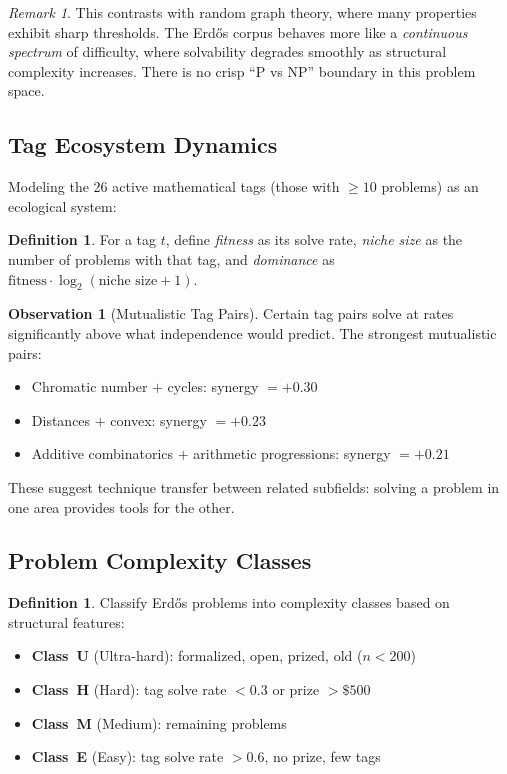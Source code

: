 \documentclass[11pt,a4paper]{article}
\theoremstyle{definition}
\newtheorem{definition}[theorem]{Definition}
\newtheorem{observation}[theorem]{Observation}
\theoremstyle{remark}
\newtheorem{remark}[theorem]{Remark}
\begin{document}
\begin{remark}
This contrasts with random graph theory, where many properties exhibit sharp
thresholds. The Erd\H{o}s corpus behaves more like a \emph{continuous spectrum}
of difficulty, where solvability degrades smoothly as structural complexity
increases. There is no crisp ``P vs NP'' boundary in this problem space.
\end{remark}

\subsection{Tag Ecosystem Dynamics}

Modeling the 26 active mathematical tags (those with $\geq 10$ problems) as
an ecological system:

\begin{definition}
For a tag $t$, define \emph{fitness} as its solve rate, \emph{niche size} as
the number of problems with that tag, and \emph{dominance} as
$\text{fitness} \cdot \log_2(\text{niche size} + 1)$.
\end{definition}

\begin{observation}[Mutualistic Tag Pairs]
Certain tag pairs solve at rates significantly above what independence would
predict. The strongest mutualistic pairs:
\begin{itemize}[nosep]
\item Chromatic number $+$ cycles: synergy $= +0.30$
\item Distances $+$ convex: synergy $= +0.23$
\item Additive combinatorics $+$ arithmetic progressions: synergy $= +0.21$
\end{itemize}
These suggest technique transfer between related subfields: solving a problem
in one area provides tools for the other.
\end{observation}

\subsection{Problem Complexity Classes}

\begin{definition}
Classify Erd\H{o}s problems into complexity classes based on structural features:
\begin{itemize}[nosep]
\item \textbf{Class~U} (Ultra-hard): formalized, open, prized, old ($n < 200$)
\item \textbf{Class~H} (Hard): tag solve rate $< 0.3$ or prize $> \$500$
\item \textbf{Class~M} (Medium): remaining problems
\item \textbf{Class~E} (Easy): tag solve rate $> 0.6$, no prize, few tags
\end{itemize}
\end{definition}
\end{document}
